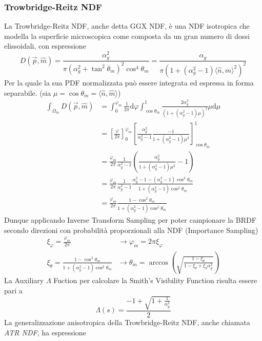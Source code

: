 \subsubsection{Trowbridge-Reitz NDF}
La Trowbridge-Reitz NDF, anche detta GGX NDF, \`e una NDF isotropica che modella la superficie microscopica come composta da un gran numero di 
dossi elissoidali, con espressione
\begin{equation}
	D(\vec{p},\hat{m})=\frac{\alpha_g^2}{\pi(\alpha_g^2+\tan^2\theta_m)^2\cos^4\theta_m}=%
		\frac{\alpha_g}{\pi(1+(\alpha_g^2-1)\langle\hat{n},\hat{m}\rangle^2)^2}
\end{equation}
Per la quale la sua PDF normalizzata pu\`o essere integrata ed espressa in forma separabile. (sia $\mu=\cos\theta_m=\langle\hat{n},\hat{m}\rangle$)
\begin{align}
	\int_{\Omega_m}D(\vec{p},\hat{m})&=\int_0^{\varphi_m}\frac{1}{2\pi}\mathrm{d}\varphi\int_{\cos\theta_m}^1\frac{2\alpha_g^2}%
		{(1+(\alpha_g^2-1)\mu)^2}\mu\mathrm{d}\mu \nonumber \\
		&=\left[\frac{\varphi}{2\pi}\right]_0^{\varphi_m}\left[\frac{\alpha_g^2}{\alpha_g^2-1}\frac{-1}{1+(\alpha_g^2-1)\mu^2}\right]_{\cos\theta_m}^1%
			\nonumber \\
		&=\frac{\varphi_m}{2\pi}\frac{1}{\alpha_g^2-1}\left(\frac{\alpha_g^2}{1+(\alpha_g^2-1)\mu^2}-1\right) \nonumber \\
		&=\frac{\varphi_m}{2\pi}\frac{1}{\alpha_g^2-1}\frac{\alpha_g^2-1-(\alpha_g^2-1)\cos^2\theta_m}{1+(\alpha_g^2-1)\cos^2\theta_m} \nonumber\\
		&=\frac{\varphi_m}{2\pi}\frac{1-\cos^2\theta_m}{1+(\alpha_g^2-1)\cos^2\theta_m}
\end{align}
Dunque applicando Inverse Transform Sampling per poter campionare la BRDF secondo direzioni con probabilit\`a proporzionali alla NDF (Importance 
Sampling)
\begin{align}
	\xi_\varphi=\frac{\varphi_m}{2\pi}&\longrightarrow\varphi_m=2\pi\xi_\varphi \\
	\xi_\theta=\frac{1-\cos^2\theta_m}{1+(\alpha_g^2-1)\cos^2\theta_m}&\longrightarrow\theta_m=%
		\arccos\left(\sqrt{\frac{1-\xi_\theta}{1-\xi_\theta+\xi_\theta\alpha_g^2}}\right)
\end{align}
La Auxiliary $\Lambda$ Fuction per calcolare la Smith's Visibility Function risulta essere pari a 
\begin{equation}
	\Lambda(s)=\frac{-1+\sqrt{1+\frac{1}{\alpha_g^2}}}{2}
\end{equation}
La generalizzazione anisotropica della Trowbridge-Reitz NDF, anche chiamata \textit{ATR NDF}, ha espressione

